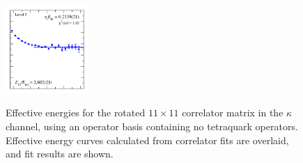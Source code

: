 \begin{figure}
  \includegraphics[width=0.28\textwidth]{figures/spectrum_a1g/no_tq/fits/fit_5.pdf}\\
  \caption{Effective energies for the rotated $11\times 11$ correlator matrix in the $\kappa$ channel, using an operator basis containing no tetraquark operators. Effective energy curves calculated from correlator fits are overlaid, and fit results are shown.}
  \label{fig:kappa_no_tq_grid}
\end{figure}

